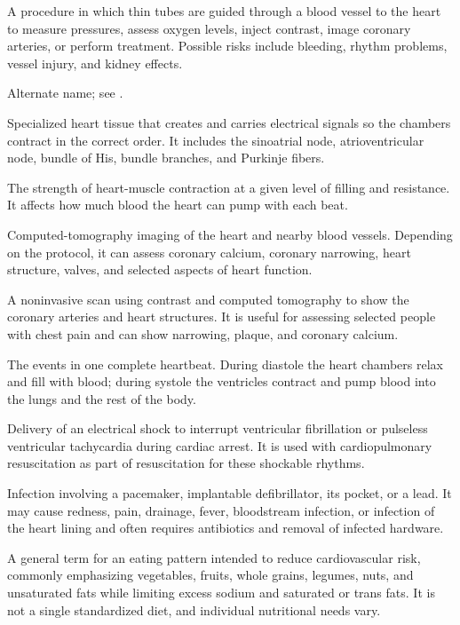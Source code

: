  A procedure in which thin tubes are guided through a blood vessel to the heart to measure pressures, assess oxygen levels, inject contrast, image coronary arteries, or perform treatment. Possible risks include bleeding, rhythm problems, vessel injury, and kidney effects.

 Alternate name; see .

 Specialized heart tissue that creates and carries electrical signals so the chambers contract in the correct order. It includes the sinoatrial node, atrioventricular node, bundle of His, bundle branches, and Purkinje fibers.

 The strength of heart-muscle contraction at a given level of filling and resistance. It affects how much blood the heart can pump with each beat.

 Computed-tomography imaging of the heart and nearby blood vessels. Depending on the protocol, it can assess coronary calcium, coronary narrowing, heart structure, valves, and selected aspects of heart function.

 A noninvasive scan using contrast and computed tomography to show the coronary arteries and heart structures. It is useful for assessing selected people with chest pain and can show narrowing, plaque, and coronary calcium.

 The events in one complete heartbeat. During diastole the heart chambers relax and fill with blood; during systole the ventricles contract and pump blood into the lungs and the rest of the body.

 Delivery of an electrical shock to interrupt ventricular fibrillation or pulseless ventricular tachycardia during cardiac arrest. It is used with cardiopulmonary resuscitation as part of resuscitation for these shockable rhythms.

 Infection involving a pacemaker, implantable defibrillator, its pocket, or a lead. It may cause redness, pain, drainage, fever, bloodstream infection, or infection of the heart lining and often requires antibiotics and removal of infected hardware.

 A general term for an eating pattern intended to reduce cardiovascular risk, commonly emphasizing vegetables, fruits, whole grains, legumes, nuts, and unsaturated fats while limiting excess sodium and saturated or trans fats. It is not a single standardized diet, and individual nutritional needs vary.

